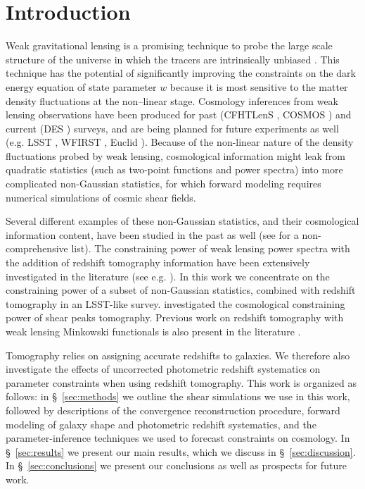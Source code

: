 \documentclass[reprint,aps,prd,superscriptaddress,showkeys,showpacs]{revtex4-1}
\begin{document}
\maketitle



\section{Introduction}
%
Weak gravitational lensing is a promising technique to probe the large scale structure of the universe in which the tracers are intrinsically unbiased \citep{wlreview}. This technique has the potential of significantly improving the constraints on the dark energy equation of state parameter $w$ because it is most sensitive to the matter density fluctuations at the non--linear stage. Cosmology inferences from weak lensing observations have been produced for past (CFHTLenS \citep{cfht1}, COSMOS \citep{cosmos}) and current (DES \citep{DES}) surveys, and are being planned for future experiments as well (e.g. LSST \citep{LSST}, WFIRST \citep{WFIRST}, Euclid \citep{Euclid}). Because of the non-linear nature of the density fluctuations probed by weak lensing, cosmological information might leak from quadratic statistics (such as two-point functions and power spectra) into more complicated non-Gaussian statistics, for which forward modeling requires numerical simulations of cosmic shear fields. 

Several different examples of these non-Gaussian statistics, and their cosmological information content, have been studied in the past as well (see \citep{MinkJan,PeaksJan,NG-Marian,NG-Jain1,NG-Jain2,NG-Jain3,NG-Refregier,NG-Dietrich} for a non-comprehensive list). The constraining power of weak lensing power spectra with the addition of redshift tomography information have been extensively investigated in the literature (see e.g. \citep{SongKnox,FangHaiman07,Huterer2006}). In this work we concentrate on the constraining power of a subset of non-Gaussian statistics, combined with redshift tomography in an LSST-like survey. \citep{MartinetPeaksTomo} investigated the cosmological constraining power of shear peaks tomography. Previous work on redshift tomography with weak lensing Minkowski functionals is also present in the literature \citep{MinkJan}. 

Tomography relies on assigning accurate redshifts to galaxies. We therefore also investigate the effects of uncorrected photometric redshift systematics on parameter constraints when using redshift tomography. This work is organized as follows: in \S~\ref{sec:methods} we outline the shear simulations we use in this work, followed by descriptions of the convergence reconstruction procedure, forward modeling of galaxy shape and photometric redshift systematics, and the parameter-inference techniques we used to forecast constraints on cosmology. In \S~\ref{sec:results} we present our main results, which we discuss in \S~\ref{sec:discussion}. In \S~\ref{sec:conclusions} we present our conclusions as well as prospects for future work.  
\end{document}
